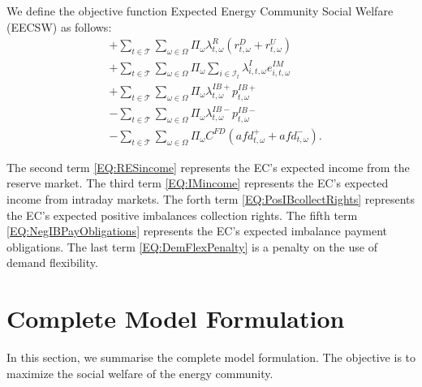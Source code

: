 \documentclass{article}
\begin{document}
We define the objective function Expected Energy Community Social Welfare (EECSW) as follows:
\begin{subequations}
	\begin{align}
		& + \sum_{t \in \mathcal{T}} \sum_{\omega \in \Omega} \Pi_{\omega} \lambda^R_{t, \omega} (r^D_{t, \omega} + r^U_{t, \omega}) \label{EQ:RESincome} \\
		& + \sum_{t \in \mathcal{T}} \sum_{\omega \in \Omega} \Pi_{\omega} \sum_{i \in \mathcal{I}_t} \lambda^{I}_{i, t, \omega} e^{IM}_{i, t, \omega} \label{EQ:IMincome} \\
		& + \sum_{t \in \mathcal{T}} \sum_{\omega \in \Omega} \Pi_{\omega} \lambda^{IB+}_{t, \omega} p^{IB+}_{t, \omega} \label{EQ:PosIBcollectRights} \\
		& - \sum_{t \in \mathcal{T}} \sum_{\omega \in \Omega} \Pi_{\omega} \lambda^{IB-}_{t, \omega} p^{IB-}_{t, \omega} \label{EQ:NegIBPayObligations} \\
		& - \sum_{t \in \mathcal{T}} \sum_{\omega \in \Omega} \Pi_{\omega} C^{FD} (afd^+_{t, \omega} + afd^-_{t, \omega}). \label{EQ:DemFlexPenalty}
	\end{align}
	\label{EQ:EECSW}
\end{subequations}

The second term \eqref{EQ:RESincome} represents the EC's expected income from the reserve market. The third term \eqref{EQ:IMincome} represents the EC's expected income from intraday markets. The forth term \eqref{EQ:PosIBcollectRights} represents the EC's expected positive imbalances collection rights. The fifth term \eqref{EQ:NegIBPayObligations} represents the EC's expected imbalance payment obligations. The last term \eqref{EQ:DemFlexPenalty} is a penalty on the use of demand flexibility.

\section{Complete Model Formulation}
\label{SEC:CompleteModelFormulation}

In this section, we summarise the complete model formulation. The objective is to maximize the social welfare of the energy community.
\end{document}
